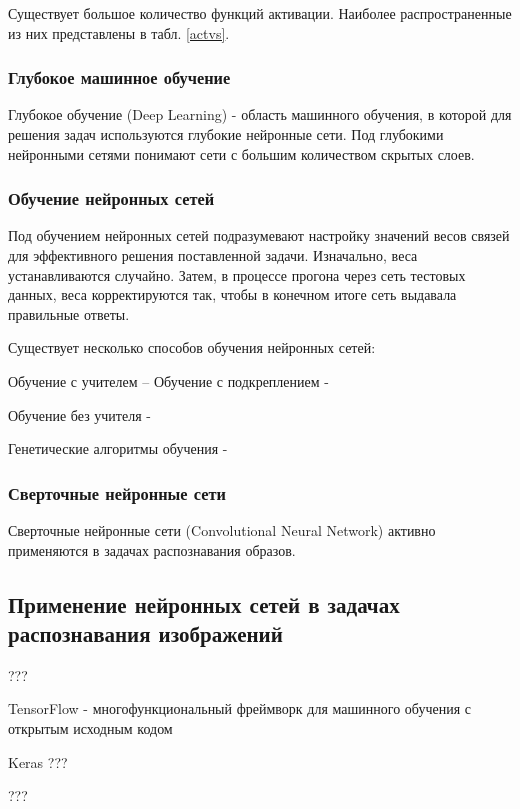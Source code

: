 Существует большое количество функций активации. Наиболее распространенные из них представлены в табл. \ref{actvs}.



\subsubsection{Глубокое машинное обучение}
Глубокое обучение (Deep Learning) - область машинного обучения, в которой для решения задач используются глубокие нейронные сети. Под глубокими нейронными сетями понимают сети с большим количеством скрытых слоев. 

\subsubsection{Обучение нейронных сетей}
Под обучением нейронных сетей подразумевают настройку значений весов связей для эффективного решения поставленной задачи. Изначально, веса устанавливаются случайно. Затем, в процессе прогона через сеть тестовых данных, веса корректируются так, чтобы в конечном итоге сеть выдавала правильные ответы. 

Существует несколько способов обучения нейронных сетей:

Обучение с учителем – 
Обучение с подкреплением -  

Обучение без учителя - 

Генетические алгоритмы обучения - 


\subsubsection{Сверточные нейронные сети}
Сверточные нейронные сети (Convolutional Neural Network) активно применяются в задачах распознавания образов. 
\subsection{Применение нейронных сетей в задачах распознавания изображений}
???

TensorFlow - многофункциональный фреймворк для машинного обучения с открытым исходным кодом

Keras ???

???
\clearpage